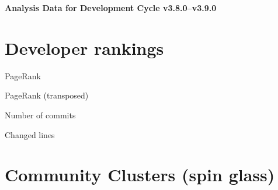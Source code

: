 \documentclass{article}
\begin{document}
\setlength{\parindent}{0pt}
\begin{center}
\begin{Large}
\textbf{Analysis Data for Development Cycle v3.8.0--v3.9.0}
\end{Large}
\end{center}
\section{Developer rankings}
\begin{small}\renewcommand{\tabcolsep}{1pt}
\begin{minipage}{0.5\linewidth}
PageRank\\

\end{minipage}%
\begin{minipage}{0.5\linewidth}
PageRank (transposed)\\

\end{minipage}

\renewcommand{\tabcolsep}{5pt}
\begin{minipage}{0.5\linewidth}
Number of commits\\

\end{minipage}%
\begin{minipage}{0.5\linewidth}
Changed lines\\

\end{minipage}
\end{small}
\newpage\section{Community Clusters (spin glass)}
\end{document}
